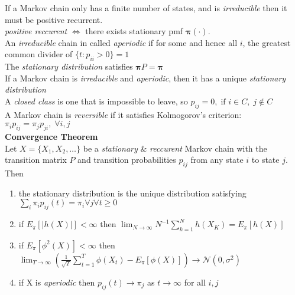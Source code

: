 \documentclass[10pt]{article} %
\begin{document}
\begin{multicols}{4}
{\begin{flushleft}
            If a Markov chain only has a finite number of states, and
            is \textit{irreducible} then it must be positive recurrent.\\
            \textit{positive reccurent} \(\Leftrightarrow\) there exists stationary
            pmf \(\boldsymbol{\pi}(\cdot)\).\\
            An \textit{irreducible} chain in called \textit{aperiodic}
            if for some and hence all \(i\), the greatest common divider of
            \(\{t: p_{ii}>0\} = 1\)\\
            The \textit{stationary distribution} satisfies \(\boldsymbol{\pi} P=\boldsymbol{\pi}\)\\
            If a Markov chain is \textit{irreducible} and \textit{aperiodic}, then it has a unique \textit{stationary distribution}\\
            A \textit{closed class} is one that is impossible to leave, so \(p_{ij} = 0,\;\text{if } i \in C,\; j \not \in C\)\\
            A Markov chain is \textit{reversible} if it satisfies Kolmogorov's criterion:\\
            \(
            \pi_i p_{ij} = \pi_j p_{ji},\; \forall i,j
            \)\\

            \textbf{Convergence Theorem}\\
            Let \(X = \{X_1,X_2,\dots\}\) be a \textit{stationary} \& \textit{reccurent} Markov chain with the transition
            matrix \(P\) and transition probabilities \(p_{ij}\) from any
            state \(i\) to state \(j\). Then
            \begin{enumerate}
                \item the stationary distribution is the unique distribution satisfying \(\sum_{i} \pi_i p_{ij}(t) = \pi_i \forall j \forall t \geq 0\)
                \item if \(E_{\pi}[|h(X)|]<\infty\) then \(\lim_{N \to \infty} N^{-1}\sum_{k=1}^N h(X_K) = E_{\pi}[h(X)]\)
                \item if \(E_{\pi}[\phi^2(X)]<\infty\) then {\tiny \(\lim_{T\to \infty} \left(\frac{1}{\sqrt{T}}\sum_{t=1}^T\phi(X_t)-E_{\pi}[\phi(X)]\right) \to \mathcal{N}(0,\sigma^2)\)}
                \item if X is \textit{aperiodic} then \(p_{ij}(t) \to \pi_j\) as \(t\to \infty\) for all \(i,j\)
            \end{enumerate}


\end{flushleft}}
\end{multicols}
\end{document}
